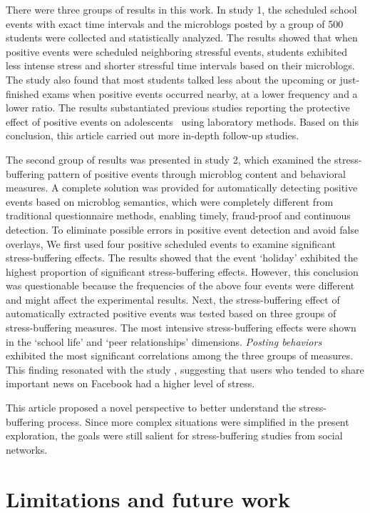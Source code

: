 \documentclass[5p,times,numbers,authoryear]{elsarticle}
\begin{document}
There were three groups of results in this work.
In study 1, the scheduled school events with exact time intervals and the microblogs posted by a group of 500 students were collected and statistically analyzed.
The results showed that when positive events were scheduled neighboring stressful events,
students exhibited less intense stress and shorter stressful time intervals based on their microblogs.
The study also found that most students talked less about the upcoming or just-finished exams when positive events occurred nearby, at a lower frequency and a lower ratio.
The results substantiated previous studies reporting the protective effect of positive events on adolescents~\citep{Cohen2010Positive,Shahar2002Positive} using laboratory methods.
Based on this conclusion, this article carried out more in-depth follow-up studies.

The second group of results was presented in study 2, which
examined the stress-buffering pattern of positive events through microblog content and behavioral measures.
A complete solution was provided for automatically detecting positive events based on microblog semantics, which were completely different from traditional questionnaire methods,
enabling timely, fraud-proof and continuous detection.
To eliminate possible errors in positive event detection and avoid false overlays,
We first used four positive scheduled events to examine significant stress-buffering effects.
The results showed that the event `holiday' exhibited the highest proportion of significant stress-buffering effects.
However, this conclusion was questionable because the frequencies of the above four events were different and might affect the experimental results.
Next, the stress-buffering effect of automatically extracted positive events was tested based on three groups of stress-buffering measures.
The most intensive stress-buffering effects were shown in the `school life' and `peer relationships' dimensions.
\emph{Posting behaviors} exhibited the most significant correlations among the three groups of measures.
This finding resonated with the study \cite{BLACHNIO2016664,Disclosure}, suggesting that users who tended to share important news on Facebook had a higher level of stress.

This article proposed a novel perspective to better understand the stress-buffering process.
Since more complex situations were simplified in the present exploration, 
the goals were still salient for stress-buffering studies from social networks.

\section{Limitations and future work}
\end{document}
